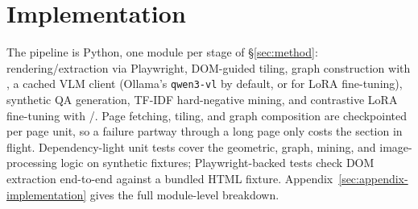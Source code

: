 \section{Implementation}
\label{sec:implementation}

The pipeline is Python, one module per stage of \S\ref{sec:method}: rendering/extraction via Playwright, DOM-guided tiling, graph construction with , a cached VLM client (Ollama's \texttt{qwen3-vl} by default, or  for LoRA fine-tuning), synthetic QA generation, TF-IDF hard-negative mining, and contrastive LoRA fine-tuning with /. Page fetching, tiling, and graph composition are checkpointed per page unit, so a failure partway through a long page only costs the section in flight. Dependency-light unit tests cover the geometric, graph, mining, and image-processing logic on synthetic fixtures; Playwright-backed tests check DOM extraction end-to-end against a bundled HTML fixture. Appendix~\ref{sec:appendix-implementation} gives the full module-level breakdown.
